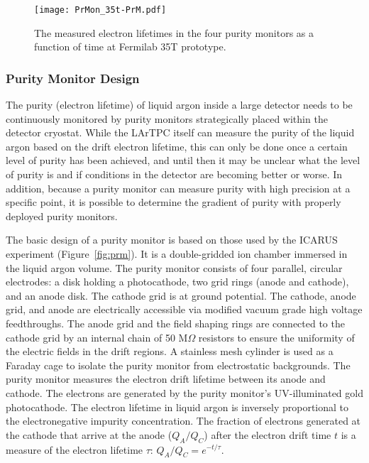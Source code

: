 \begin{figure}[t!]
\begin{center}
\texttt{[image: PrMon\_35t-PrM.pdf]}
\caption{The measured electron lifetimes in the four purity monitors as a function of time at Fermilab 35T prototype.} \label{fig-35t-prm}
\end{center}
\end{figure}


\subsubsection{Purity Monitor Design}



The purity (electron lifetime) of liquid argon inside a large detector needs to be continuously monitored by purity monitors strategically placed within the detector cryostat. While the LArTPC itself can measure the purity of the liquid argon based on the drift electron lifetime, this can only be done once a certain level of purity has been achieved, and until then it may be unclear what the level of purity is and if conditions in the detector are becoming better or worse. In addition, because a purity monitor can measure purity with high precision at a specific point, it is possible to determine the gradient of purity with properly deployed purity monitors.


The basic design of a purity monitor is based on those used by the ICARUS experiment (Figure~\ref{fig:prm}). It is a double-gridded ion chamber immersed in the liquid argon volume. The purity monitor consists of four parallel, circular electrodes: a disk holding a photocathode, two grid rings (anode and cathode), and an anode disk. The cathode grid is at ground potential. The cathode, anode grid, and anode are electrically accessible via modified vacuum grade high voltage feedthroughs. The anode grid and the field shaping rings are connected to the cathode grid by an internal chain of 50 M$\Omega$ resistors to ensure the uniformity of the electric fields in the drift regions. A stainless mesh cylinder is used as a Faraday cage to isolate the purity monitor from electrostatic backgrounds. The purity monitor measures the electron drift lifetime between its anode and cathode. The electrons are generated by the purity monitor's UV-illuminated gold photocathode. The electron lifetime in liquid argon is inversely proportional to the electronegative impurity concentration. The fraction of electrons generated at the cathode that arrive at the anode ($Q_A/Q_C$) after the electron drift time $t$ is a measure of the electron lifetime $\tau$: $Q_A/Q_C=e^{-t/\tau}$.

